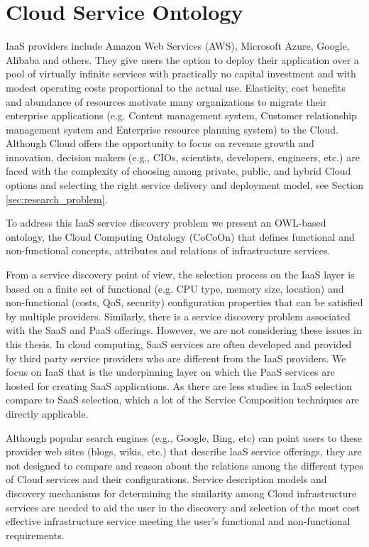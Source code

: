 \chapter{Cloud Service Ontology}
\label{cha:cocoon}
IaaS providers include Amazon Web Services (AWS), Microsoft Azure, Google, Alibaba and others. They give users the option to deploy their application over a pool of virtually infinite services with practically no capital investment and with modest operating costs proportional to the actual use. Elasticity, cost benefits and abundance of resources motivate many organizations to migrate their enterprise applications (e.g. Content management system, Customer relationship management system and Enterprise resource planning system) to the Cloud. Although Cloud offers the opportunity to focus on revenue growth and innovation, decision makers (e.g., CIOs, scientists, developers, engineers, etc.) are faced with the complexity of choosing among private, public, and hybrid Cloud options and selecting the right service delivery and deployment model, see Section \ref{sec:research_problem}.

To address this IaaS service discovery problem
we present an OWL-based ontology, the Cloud Computing Ontology (CoCoOn)
that defines functional and non-functional concepts, attributes
and relations of infrastructure services.

From a service discovery point of view, the selection process on the IaaS layer is based on a finite set of functional (e.g. CPU type, memory size, location) and non-functional (costs, QoS, security) configuration properties that can be satisfied by multiple providers. Similarly, there is a service discovery problem associated with the SaaS and PaaS offerings. However, we are not considering these issues in this thesis.
In cloud computing, SaaS services are often developed
and provided by third party service providers who are different from the IaaS providers.
We focus on IaaS that is the underpinning layer
on which the PaaS services are hosted for creating SaaS applications.
As there are less studies in IaaS selection compare to SaaS selection,
which a lot of the Service Composition techniques are directly applicable.


Although popular search engines (e.g., Google, Bing, etc)
can point users to these provider web sites (blogs, wikis, etc.)
that describe laaS service offerings, they are not designed to
compare and reason about the relations among the different
types of Cloud services and their configurations. Service
description models and discovery mechanisms for
determining the similarity among Cloud infrastructure
services are needed to aid the user in the discovery and
selection of the most cost effective infrastructure service
meeting the user's functional and non-functional
requirements.

